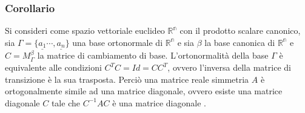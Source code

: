 \subsubsection{Corollario}
Si consideri come spazio vettoriale euclideo $\mathbb{R^n}$ con il prodotto scalare canonico, sia $\Gamma=\{\underline{a_1}\cdots,\underline{a_n}\}$ una base ortonormale di
$\mathbb{R^n}$ e sia $\beta$ la base canonica di $\mathbb{R^n}$ e $C=M_\Gamma^\beta$ la matrice di cambiamento di base. L'ortonormalit\`a della base $\Gamma$ \`e equivalente
alle condizioni $C^TC=Id=CC^T$, ovvero l'inversa della matrice di transizione \`e la sua trasposta. Perci\`o una matrice reale simmetria $A$ \`e ortogonalmente simile ad una 
matrice diagonale, ovvero esiste una matrice diagonale $C$ tale che $C^{-1}AC$ \`e una matrice diagonale .